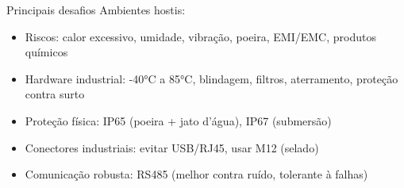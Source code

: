 \begin{frame}[fragile]{Principais desafios}
    Ambientes hostis:
    \begin{itemize}
        \item Riscos: calor excessivo, umidade, vibração, poeira, EMI/EMC, produtos químicos
        \item Hardware industrial: -40°C a 85°C, blindagem, filtros, aterramento, proteção contra surto
        \item Proteção física: IP65 (poeira + jato d'água), IP67 (submersão)
        \item Conectores industriais: evitar USB/RJ45, usar M12 (selado)
        \item Comunicação robusta: RS485 (melhor contra ruído, tolerante à falhas)
    \end{itemize}
\end{frame}